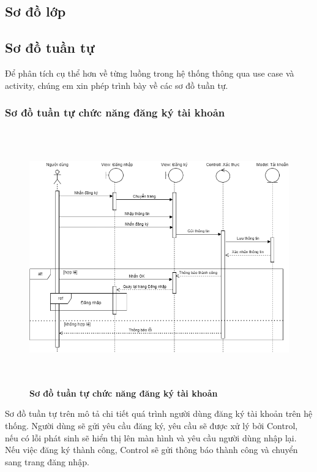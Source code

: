 \subsection{Sơ đồ lớp}

\subsection{Sơ đồ tuần tự}
Để phân tích cụ thể hơn về từng luồng trong hệ thống thông qua use case và activity, chúng em xin phép
trình bày về các sơ đồ tuần tự.

\subsubsection{Sơ đồ tuần tự chức năng đăng ký tài khoản}
\begin{figure}[H]
  \centering
  \includegraphics[width=14.5cm,height=11cm]{Images/sequence/sequence_register.png}
  \caption[Sơ đồ tuần tự chức năng đăng ký tài khoản]{\bfseries \fontsize{12pt}{0pt}
  \selectfont Sơ đồ tuần tự chức năng đăng ký tài khoản}
  \label{sequence_register} %
\end{figure}
Sơ đồ tuần tự trên mô tả chi tiết quá trình người dùng đăng ký tài khoản trên hệ thống. Người dùng sẽ gửi yêu cầu đăng ký, yêu cầu sẽ được xử lý
bởi Control, nếu có lỗi phát sinh sẽ hiển thị lên màn hình và yêu cầu người dùng nhập lại. Nếu việc đăng ký thành công, Control sẽ gửi thông báo 
thành công và chuyển sang trang đăng nhập.  


